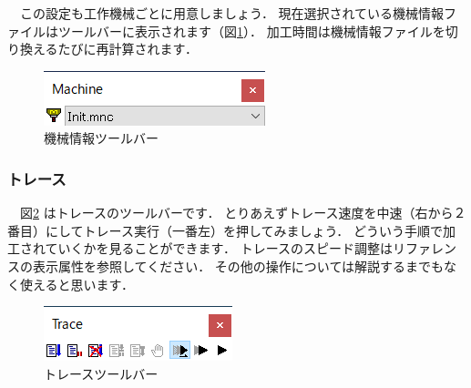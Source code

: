 \vspace*{2zh}
　この設定も工作機械ごとに用意しましょう．
現在選択されている機械情報ファイルはツールバーに表示されます（図\ref{fig:select.png}）．
加工時間は機械情報ファイルを切り換えるたびに再計算されます．

\begin{figure}[H]
\centering
\includegraphics{No2/fig/select.png}
\caption{機械情報ツールバー}
\label{fig:select.png}
\end{figure}

\subsubsection{トレース}

　図\ref{fig:trace.png} はトレースのツールバーです．
とりあえずトレース速度を中速（右から２番目）にしてトレース実行（一番左）を押してみましょう．
どういう手順で加工されていくかを見ることができます．
トレースのスピード調整はリファレンスの表示属性を参照してください．
その他の操作については解説するまでもなく使えると思います．

\begin{figure}[H]
\centering
\includegraphics{No2/fig/trace.png}
\caption{トレースツールバー}
\label{fig:trace.png}
\end{figure}
